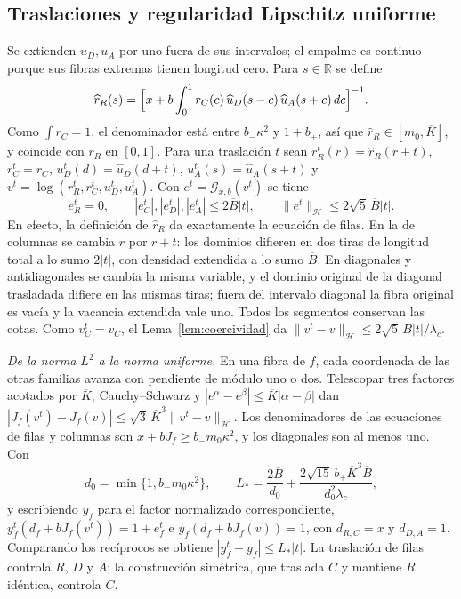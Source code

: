 \subsection{Traslaciones y regularidad Lipschitz uniforme}

Se extienden $u_D,u_A$ por uno fuera de sus intervalos; el empalme es continuo porque sus fibras
extremas tienen longitud cero. Para $s\in\mathbb R$ se define
\[
 \widehat r_R(s)=\Bigl[x+b\int_0^1r_C(c)\,\widehat u_D(s-c)\,\widehat u_A(s+c)\,dc\Bigr]^{-1}.
\]
Como $\int r_C=1$, el denominador está entre $b_-\kappa^2$ y $1+b_+$, así que
$\widehat r_R\in[m_0,\overline K]$, y coincide con $r_R$ en $[0,1]$. Para una traslación $t$ sean
$r_R^t(r)=\widehat r_R(r+t)$, $r_C^t=r_C$, $u_D^t(d)=\widehat u_D(d+t)$,
$u_A^t(s)=\widehat u_A(s+t)$ y $v^t=\log(r_R^t,r_C^t,u_D^t,u_A^t)$. Con
$e^t=\mathcal G_{x,b}(v^t)$ se tiene
\[
 e_R^t=0,\qquad |e_C^t|,|e_D^t|,|e_A^t|\le2\overline B|t|,\qquad
 \|e^t\|_{\mathcal H}\le2\sqrt5\,\overline B|t| .
\]
En efecto, la definición de $\widehat r_R$ da exactamente la ecuación de filas. En la de
columnas se cambia $r$ por $r+t$: los dominios difieren en dos tiras de longitud total a lo sumo
$2|t|$, con densidad extendida a lo sumo $\overline B$. En diagonales y antidiagonales se cambia
la misma variable, y el dominio original de la diagonal trasladada difiere en las mismas tiras;
fuera del intervalo diagonal la fibra original es vacía y la vacancia extendida vale uno. Todos
los segmentos conservan las cotas. Como $v_C^t=v_C$, el Lema~\ref{lem:coercividad} da
$\|v^t-v\|_{\mathcal H}\le2\sqrt5\,\overline B|t|/\lambda_c$.

\emph{De la norma $L^2$ a la norma uniforme.} En una fibra de $f$, cada coordenada de las otras
familias avanza con pendiente de módulo uno o dos. Telescopar tres factores acotados por
$\overline K$, Cauchy--Schwarz y $|e^\alpha-e^\beta|\le\overline K|\alpha-\beta|$ dan
$|J_f(v^t)-J_f(v)|\le\sqrt3\,\overline K^3\|v^t-v\|_{\mathcal H}$. Los denominadores de las
ecuaciones de filas y columnas son $x+bJ_f\ge b_-m_0\kappa^2$, y los diagonales son al menos uno.
Con
\[
 d_0=\min\{1,b_-m_0\kappa^2\},\qquad
 L_*=\frac{2\overline B}{d_0}+\frac{2\sqrt{15}\,b_+\overline K^3\overline B}{d_0^2\lambda_c},
\]
y escribiendo $y_f$ para el factor normalizado correspondiente,
$y_f^t(d_f+bJ_f(v^t))=1+e_f^t$ e $y_f(d_f+bJ_f(v))=1$, con $d_{R,C}=x$ y $d_{D,A}=1$. Comparando
los recíprocos se obtiene $|y_f^t-y_f|\le L_*|t|$. La traslación de filas controla $R$, $D$ y
$A$; la construcción simétrica, que traslada $C$ y mantiene $R$ idéntica, controla $C$.

